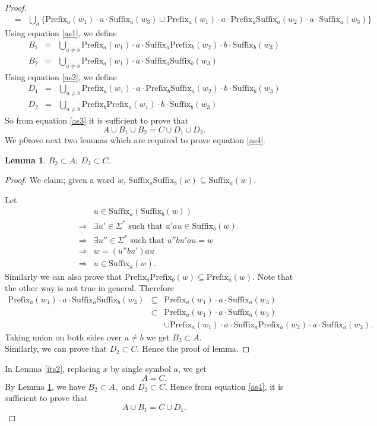 \documentclass{llncs}
\newtheorem{lem}{Lemma}
\newcommand{\sg}{\Sigma}
\newcommand{\cd}{\cdot}
\newcommand{\p}{\mathrm{Prefix}}
\newcommand{\s}{\mathrm{Suffix}}
\begin{document}
\begin{proof}
\begin{eqnarray*}
    &=&\bigcup_a\{\p_a(w_1)\cd a\cd\s_a(w_3)\cup \p_a(w_1)\cd a\cd\p_a\s_a(w_2)\cd a\cd \s_a(w_3)\}
\end{eqnarray*}
Using equation \ref{as1}, we define
\begin{eqnarray*}
B_1&=&\bigcup_{a\neq  b}\p_a(w_1)\cd a\cd\s_a\p_b(w_2)\cd b\cd\s_b(w_3)\\
B_2&=&\bigcup_{a\neq  b} \p_a(w_1)\cd a\cd\s_a\s_b(w_3)
\end{eqnarray*}
Using equation \ref{as2}, we define
\begin{eqnarray*}
D_1&=&\bigcup_{a\neq  b}\p_a(w_1)\cd a\cd\p_b\s_a(w_2)\cd b\cd\s_b(w_3)\\
D_2&=&\bigcup_{a\neq  b}\p_b\p_a(w_1)\cd b\cd\s_b(w_3)
\end{eqnarray*}
So from equation \ref{as3} it is sufficient to prove that
\begin{equation}\label{as4}
A\cup B_1\cup B_2=C\cup D_1\cup D_2.
\end{equation}
We p0rove next two lemmas which are required to prove equation
\ref{as4}.
\begin{lem}\label{asl1}
$B_2\subset A;~D_2\subset C$.
\end{lem}
\begin{proof}
\par We claim; given a word $w$, $\s_a\s_b(w)\subseteq\s_a(w)$.\\
\par Let
\begin{eqnarray*}
&& u\in\s_a(\s_b(w))\\
&\Rightarrow&\exists u'\in\sg^* \mbox{~such that~}u'au\in\s_b(w)\\
&\Rightarrow&\exists u''\in\sg^* \mbox{~such that~}u''bu'au=w\\
&\Rightarrow&w=(u''bu')au\\
&\Rightarrow&u\in\s_a(w).
\end{eqnarray*}
Similarly we can also prove that $\p_a\p_b(w)\subseteq\p_a(w)$. Note
that the other way is not true in general. Therefore
\begin{eqnarray*}
 \p_a(w_1)\cd a\cd \s_a\s_b(w_3)&\subseteq&\p_a(w_1)\cd a\cd\s_a(w_3)\\
        &\subset&\p_a(w_1)\cd a\cd\s_a(w_3)\\
        &&\cup\p_a(w_1)\cd a\cd\s_a\p_a(w_2)\cd a\cd \s_a(w_3).
\end{eqnarray*}
Taking union on both sides over $a\neq b$ we get $B_2\subset A$.\\
Similarly, we can prove that $D_2\subset C$. Hence the proof of
lemma.
\end{proof}
 In Lemma \ref{its2}, replacing $x$ by single symbol $a$, we get
\begin{equation}\label{as5}
A=C.
\end{equation}
By  Lemma \ref{asl1}, we have $B_2\subset A,$ and $D_2\subset C$. Hence from equation \ref{as4}, it is sufficient to prove that
\[A\cup B_1=C\cup D_1.\]


\end{proof}
\end{document}
